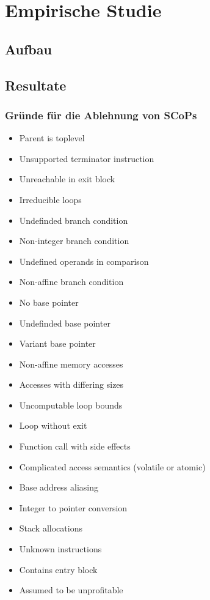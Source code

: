\chapter{Empirische Studie}
\section{Aufbau}

\section{Resultate}
\subsection{Gründe für die Ablehnung von SCoPs}
\begin{itemize}
    \item Parent is toplevel
        
    \item Unsupported terminator instruction
    \item Unreachable in exit block
        
    \item Irreducible loops
        
    \item Undefinded branch condition
    \item Non-integer branch condition
    \item Undefined operands in comparison
    \item Non-affine branch condition
    \item No base pointer
    \item Undefinded base pointer
    \item Variant base pointer
        
    \item Non-affine memory accesses
        
    \item Accesses with differing sizes
    \item Uncomputable loop bounds
        
    \item Loop without exit
        
    \item Function call with side effects
        
    \item Complicated access semantics (volatile or atomic)
    \item Base address aliasing
        
    \item Integer to pointer conversion
        
    \item Stack allocations
    \item Unknown instructions
    \item Contains entry block
    \item Assumed to be unprofitable
        
\end{itemize}

